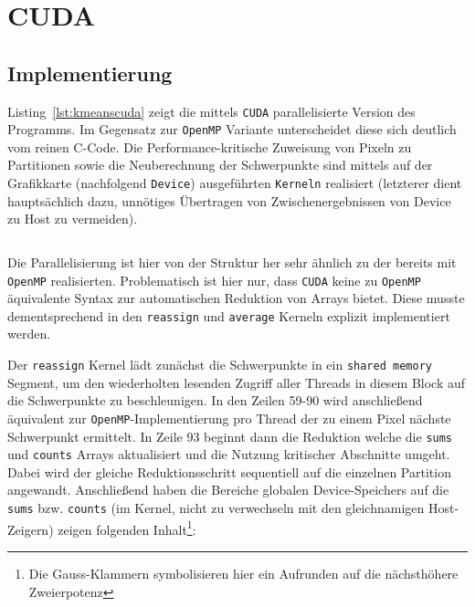 \documentclass[
    bibliography=totoc, cd=lightcolor, cdmath=false, ngerman]{tudscrreprt}
\begin{document}
\section{CUDA}

\subsection{Implementierung}

Listing~\ref{lst:kmeanscuda} zeigt die mittels \texttt{CUDA} parallelisierte
Version des Programms. Im Gegensatz zur \texttt{OpenMP} Variante unterscheidet
diese sich deutlich vom reinen C-Code. Die Performance-kritische Zuweisung von
Pixeln zu Partitionen sowie die Neuberechnung der Schwerpunkte sind mittels auf
der Grafikkarte (nachfolgend \texttt{Device}) ausgeführten \texttt{Kerneln}
realisiert (letzterer dient hauptsächlich dazu, unnötiges Übertragen von
Zwischenergebnissen von Device zu Host zu vermeiden).

\inputminted[label=kmeanscuda]{CUDA}{c/src/kmeans.cu}

Die Parallelisierung ist hier von der Struktur her sehr ähnlich zu der bereits
mit \texttt{OpenMP} realisierten. Problematisch ist hier nur, dass
\texttt{CUDA} keine zu \texttt{OpenMP} äquivalente Syntax zur automatischen
Reduktion von Arrays bietet. Diese musste dementsprechend in
den \texttt{reassign} und \texttt{average} Kerneln explizit implementiert
werden.

Der \texttt{reassign} Kernel lädt zunächst die Schwerpunkte in ein
\texttt{shared memory} Segment, um den wiederholten lesenden Zugriff aller
Threads in diesem Block auf die Schwerpunkte zu beschleunigen. In den Zeilen
59-90 wird anschließend äquivalent zur \texttt{OpenMP}-Implementierung pro
Thread der zu einem Pixel nächste Schwerpunkt ermittelt. In Zeile 93 beginnt
dann die Reduktion welche die \texttt{sums} und \texttt{counts} Arrays
aktualisiert und die Nutzung kritischer Abschnitte umgeht. Dabei wird der
gleiche Reduktionsschritt sequentiell auf die einzelnen Partition angewandt.
Anschließend haben die Bereiche globalen Device-Speichers auf die \texttt{sums}
bzw. \texttt{counts} (im Kernel, nicht zu verwechseln mit den gleichnamigen
Host-Zeigern) zeigen folgenden Inhalt\footnote{Die Gauss-Klammern symbolisieren
hier ein Aufrunden auf die nächsthöhere Zweierpotenz}:

\vspace{10pt}
\end{document}
